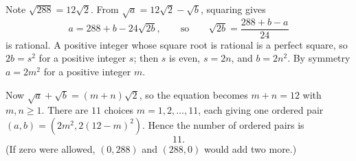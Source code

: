Note $\sqrt{288}=12\sqrt2$. From $\sqrt a=12\sqrt2-\sqrt b$, squaring gives
\[
a=288+b-24\sqrt{2b},\qquad\text{so}\qquad \sqrt{2b}=\dfrac{288+b-a}{24}
\]
is rational. A positive integer whose square root is rational is a perfect square, so $2b=s^2$ for a positive integer $s$; then $s$ is even, $s=2n$, and $b=2n^2$. By symmetry $a=2m^2$ for a positive integer $m$.

Now $\sqrt a+\sqrt b=(m+n)\sqrt2$, so the equation becomes $m+n=12$ with $m,n\ge1$. There are $11$ choices $m=1,2,\dots,11$, each giving one ordered pair $(a,b)=(2m^2,2(12-m)^2)$. Hence the number of ordered pairs is
\[\boxed{11}.\]
(If zero were allowed, $(0,288)$ and $(288,0)$ would add two more.)
